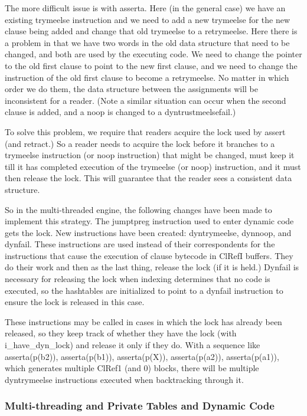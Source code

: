 \documentclass[11pt]{article}
\begin{document}
The more difficult issue is with asserta.  Here (in the general case)
we have an existing trymeelse instruction and we need to add a new
trymeelse for the new clause being added and change that old trymeelse
to a retrymeelse.  Here there is a problem in that we have two words
in the old data structure that need to be changed, and both are used
by the executing code.  We need to change the pointer to the old first
clause to point to the new first clause, and we need to change the
instruction of the old first clause to become a retrymeelse.  No
matter in which order we do them, the data structure between the
assignments will be inconsistent for a reader.  (Note a similar
situation can occur when the second clause is added, and a noop is
changed to a dyntrustmeelsefail.)

To solve this problem, we require that readers acquire the lock used
by assert (and retract.)  So a reader needs to acquire the lock before
it branches to a trymeelse instruction (or noop instruction) that
might be changed, must keep it till it has completed execution of the
trymeelse (or noop) instruction, and it must then release the lock.
This will guarantee that the reader sees a consistent data structure.

So in the multi-threaded engine, the following changes have been made
to implement this strategy.  The jumptpreg instruction used to enter
dynamic code gets the lock.  New instructions have been created:
dyntrymeelse, dynnoop, and dynfail.  These instructions are used
instead of their correspondents for the instructions that cause the
execution of clause bytecode in ClRefI buffers.  They do their work
and then as the last thing, release the lock (if it is held.)  Dynfail
is necessary for releasing the lock when indexing determines that no
code is executed, so the hashtables are initialized to point to a
dynfail instruction to ensure the lock is released in this case.

These instructions may be called in cases in which the lock has
already been released, so they keep track of whether they have the
lock (with i\_have\_dyn\_lock) and release it only if they do.  With a
sequence like asserta(p(b2)), asserta(p(b1)), asserta(p(X)),
asserta(p(a2)), asserta(p(a1)), which generates multiple ClRef1 (and
0) blocks, there will be multiple dyntrymeelse instructions executed
when backtracking through it.

\subsubsection{Multi-threading and Private Tables and Dynamic Code}
\end{document}
